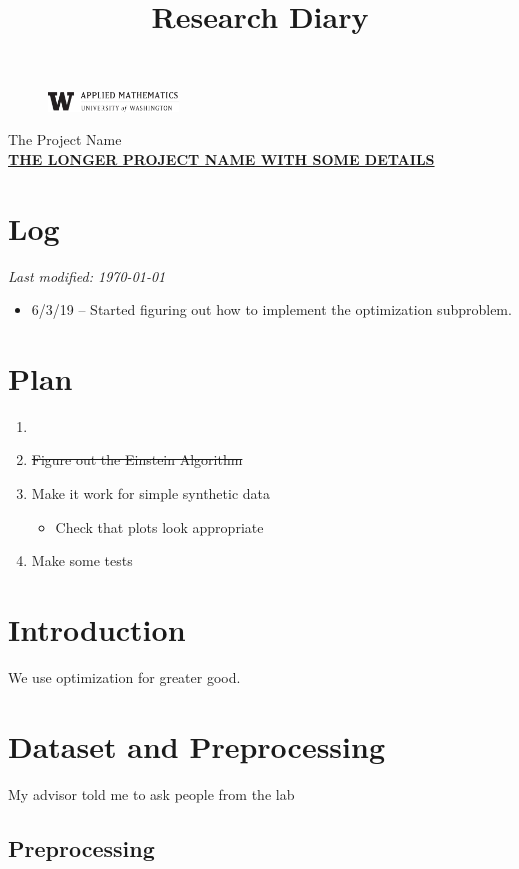 \documentclass[11pt,letterpaper]{article}
\newcommand{\projectNameShort}{The Project Name}
\newcommand{\projectNameLong}{The Longer Project Name with Some Details}
\newcommand{\univlogo}{%
  \noindent %
  \begin{figure}
    \vspace{-24pt}
    \begin{center}
      \includegraphics[width=0.31\textwidth]{Images/univ-logo.jpg}
    \end{center}
    \vspace{-10pt}
  \end{figure}
}
\numberwithin{equation}{section} %
\numberwithin{figure}{section} %
\numberwithin{table}{section} %
\begin{document}
\title{Research Diary}
\univlogo
{\Huge \projectNameShort}\\[2mm]

{\large \underline{\textbf{\uppercase{\projectNameLong}}}}\\

\section*{Log}
\textit{Last modified: \today}
\begin{itemize}
    \item 6/3/19 -- Started figuring out how to implement the optimization subproblem. 
\end{itemize}

\section*{Plan}
\begin{enumerate}
    \item {}
    \item \sout{Figure out the Einstein Algorithm}
    \item Make it work for simple synthetic data
        \begin{itemize}
            \item Check that plots look appropriate 
        \end{itemize}
    \item Make some tests
\end{enumerate}

\listoftodos

\newpage

\section*{Introduction} 
We use optimization \cite{Zheng2018RelaxAndSplit} for greater good.  

\section{Dataset and Preprocessing} %
\label{sec:dataset_and_preprocessing}

\begin{tip}My advisor told me to ask people from the lab\end{tip}

\subsection{Preprocessing} %
\label{sub:preprocessing}
\end{document}
